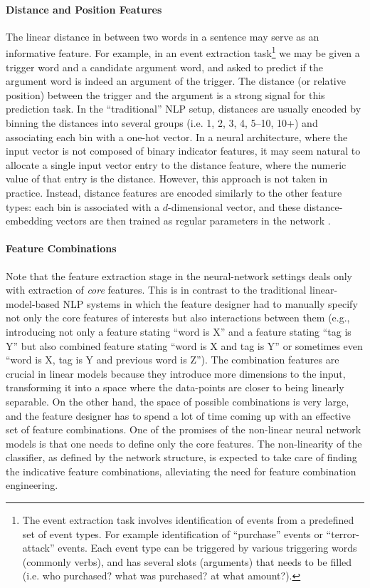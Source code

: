 \documentclass[jair,twoside,11pt,theapa]{article}
\newcommand{\ygcomment}[1]{\textbf{[TODO: #1]}}
\renewcommand{\ygcomment}[1]{}
\begin{document}
{\paragraph{Distance and Position Features} The linear distance in between two words in a
sentence may serve as an informative feature. For example, in an event
extraction task\footnote{The event extraction task involves identification of
events from a predefined set of event types. For example identification of
``purchase'' events or ``terror-attack'' events.  Each event type can be
triggered by various triggering words (commonly verbs), and has several slots
(arguments)
that needs to be filled (i.e. who purchased? what was purchased? at what
amount?).}
we may be given a trigger word and a candidate argument word, and asked to
predict if the argument word is indeed an argument of the trigger. The distance (or relative position)
between the trigger and the argument is a strong signal for this prediction task.  In the
``traditional'' NLP setup, distances are usually encoded by binning the
distances into several groups (i.e. 1, 2, 3, 4, 5--10, 10+) and associating each bin
with a one-hot vector.  In a neural architecture, where the input vector is not composed of binary indicator features, it may seem natural to allocate a single
input vector entry to the distance feature, where the numeric value of that entry is the distance. However,
this approach is not taken in practice. Instead,
distance features are encoded
similarly to the other feature types: each bin is associated with a
$d$-dimensional vector, and these distance-embedding vectors are then trained as
regular parameters in the
network \cite{zeng2014relation,dossantos2015classifying,zhu2015reranking,nguyen2015event}.


\paragraph{Feature Combinations} Note that the feature extraction stage in the
neural-network settings deals only with extraction of \emph{core} features.
This is in contrast to the traditional linear-model-based NLP systems in which the
feature designer had to manually specify not only the core features of interests but
also interactions between them (e.g., introducing not only a feature stating
``word is X'' and a feature
stating ``tag is Y'' but also combined feature stating ``word is X and tag is Y'' or
sometimes even ``word is X, tag is Y and previous word is Z'').  The combination
features are crucial in linear models because they introduce more
dimensions to the input, transforming it into a space where the data-points are
closer to being linearly separable. On the other hand, the space of possible
combinations is very large, and the feature designer has to spend a lot of time
coming up with an effective set of feature combinations.\ygcomment{also not
stat-efficient. very high dim.}
One of the
promises of the non-linear neural network models is that one needs to define 
only the core features. The non-linearity of the classifier, as defined by the
network structure, is expected to take care of finding the indicative feature
combinations, alleviating the need for feature combination engineering.

}
\end{document}
